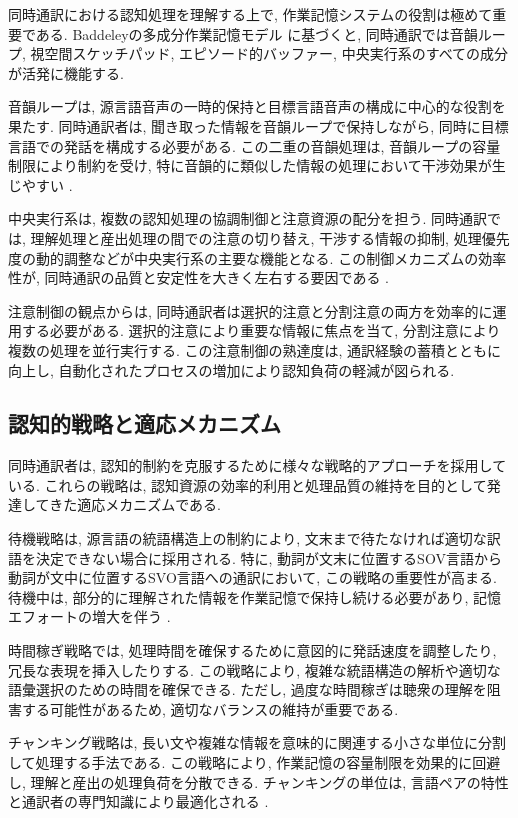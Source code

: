 同時通訳における認知処理を理解する上で, 作業記憶システムの役割は極めて重要である.
Baddeleyの多成分作業記憶モデル \cite{baddeley2000episodic} に基づくと, 同時通訳では音韻ループ, 視空間スケッチパッド, エピソード的バッファー, 中央実行系のすべての成分が活発に機能する.

音韻ループは, 源言語音声の一時的保持と目標言語音声の構成に中心的な役割を果たす.
同時通訳者は, 聞き取った情報を音韻ループで保持しながら, 同時に目標言語での発話を構成する必要がある.
この二重の音韻処理は, 音韻ループの容量制限により制約を受け, 特に音韻的に類似した情報の処理において干渉効果が生じやすい \cite{christoffels2006cognitive}.

中央実行系は, 複数の認知処理の協調制御と注意資源の配分を担う.
同時通訳では, 理解処理と産出処理の間での注意の切り替え, 干渉する情報の抑制, 処理優先度の動的調整などが中央実行系の主要な機能となる.
この制御メカニズムの効率性が, 同時通訳の品質と安定性を大きく左右する要因である \cite{mizuno2005process}.

注意制御の観点からは, 同時通訳者は選択的注意と分割注意の両方を効率的に運用する必要がある.
選択的注意により重要な情報に焦点を当て, 分割注意により複数の処理を並行実行する.
この注意制御の熟達度は, 通訳経験の蓄積とともに向上し, 自動化されたプロセスの増加により認知負荷の軽減が図られる.

\subsection{認知的戦略と適応メカニズム}

同時通訳者は, 認知的制約を克服するために様々な戦略的アプローチを採用している.
これらの戦略は, 認知資源の効率的利用と処理品質の維持を目的として発達してきた適応メカニズムである.

待機戦略は, 源言語の統語構造上の制約により, 文末まで待たなければ適切な訳語を決定できない場合に採用される.
特に, 動詞が文末に位置するSOV言語から動詞が文中に位置するSVO言語への通訳において, この戦略の重要性が高まる.
待機中は, 部分的に理解された情報を作業記憶で保持し続ける必要があり, 記憶エフォートの増大を伴う \cite{gile1995basic}.

時間稼ぎ戦略では, 処理時間を確保するために意図的に発話速度を調整したり, 冗長な表現を挿入したりする.
この戦略により, 複雑な統語構造の解析や適切な語彙選択のための時間を確保できる.
ただし, 過度な時間稼ぎは聴衆の理解を阻害する可能性があるため, 適切なバランスの維持が重要である.

チャンキング戦略は, 長い文や複雑な情報を意味的に関連する小さな単位に分割して処理する手法である.
この戦略により, 作業記憶の容量制限を効果的に回避し, 理解と産出の処理負荷を分散できる.
チャンキングの単位は, 言語ペアの特性と通訳者の専門知識により最適化される \cite{daro1994memory}.

